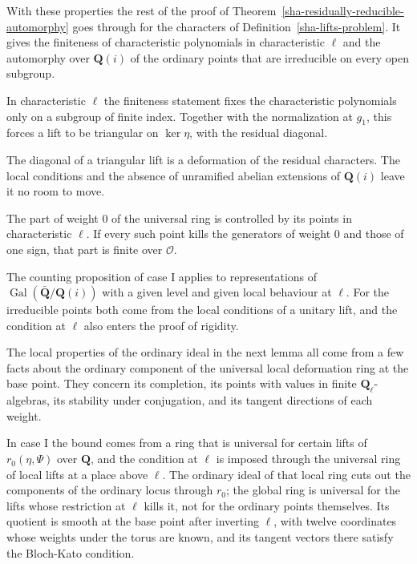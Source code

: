 With these properties the rest of the proof of Theorem~\ref{sha-residually-reducible-automorphy} goes through for the characters of Definition~\ref{sha-lifts-problem}. It gives the finiteness of characteristic polynomials in characteristic $\ell$ and the automorphy over $\mathbf Q(i)$ of the ordinary points that are irreducible on every open subgroup.

In characteristic $\ell$ the finiteness statement fixes the characteristic polynomials only on a subgroup of finite index. Together with the normalization at $g_1$, this forces a lift to be triangular on $\ker\eta$, with the residual diagonal.

The diagonal of a triangular lift is a deformation of the residual characters. The local conditions and the absence of unramified abelian extensions of $\mathbf Q(i)$ leave it no room to move.

The part of weight $0$ of the universal ring is controlled by its points in characteristic $\ell$. If every such point kills the generators of weight $0$ and those of one sign, that part is finite over $\mathcal O$.

The counting proposition of case I applies to representations of $\operatorname{Gal}(\bar{\mathbf Q}/\mathbf Q(i))$ with a given level and given local behaviour at $\ell$. For the irreducible points both come from the local conditions of a unitary lift, and the condition at $\ell$ also enters the proof of rigidity.

The local properties of the ordinary ideal in the next lemma all come from a few facts about the ordinary component of the universal local deformation ring at the base point. They concern its completion, its points with values in finite $\mathbf Q_\ell$-algebras, its stability under conjugation, and its tangent directions of each weight.

In case I the bound comes from a ring that is universal for certain lifts of $r_0(\eta,\Psi)$ over $\mathbf Q$, and the condition at $\ell$ is imposed through the universal ring of local lifts at a place above $\ell$. The ordinary ideal of that local ring cuts out the components of the ordinary locus through $r_0$; the global ring is universal for the lifts whose restriction at $\ell$ kills it, not for the ordinary points themselves. Its quotient is smooth at the base point after inverting $\ell$, with twelve coordinates whose weights under the torus are known, and its tangent vectors there satisfy the Bloch-Kato condition.

